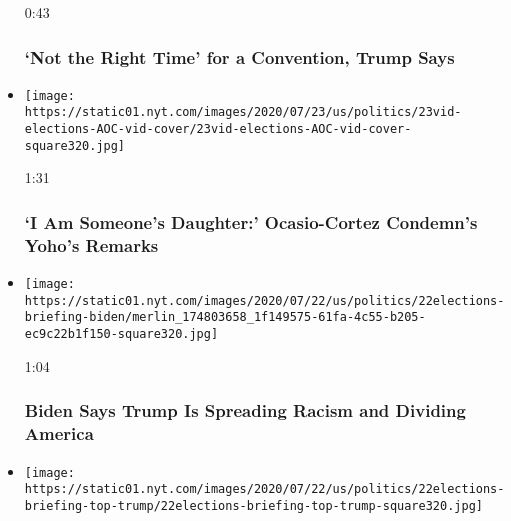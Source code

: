 \begin{itemize}
  0:43

  \hypertarget{not-the-right-time-for-a-convention-trump-says}{%
  \subsubsection{`Not the Right Time' for a Convention, Trump
  Says}\label{not-the-right-time-for-a-convention-trump-says}}
\item
  \href{https://www.nytimes.com/video/us/100000007253391/aoc-confronts-yoho.html?action=click\&module=video-series-bar\&region=header\&pgtype=Article\&playlistId=video/us-politics}{}

  \texttt{[image: https://static01.nyt.com/images/2020/07/23/us/politics/23vid-elections-AOC-vid-cover/23vid-elections-AOC-vid-cover-square320.jpg]}

  1:31

  \hypertarget{i-am-someones-daughter-ocasio-cortez-condemns-yohos-remarks}{%
  \subsubsection{`I Am Someone's Daughter:' Ocasio-Cortez Condemn's
  Yoho's
  Remarks}\label{i-am-someones-daughter-ocasio-cortez-condemns-yohos-remarks}}
\item
  \href{https://www.nytimes.com/video/us/100000007251300/biden-trump-racist-divide-america.html?action=click\&module=video-series-bar\&region=header\&pgtype=Article\&playlistId=video/us-politics}{}

  \texttt{[image: https://static01.nyt.com/images/2020/07/22/us/politics/22elections-briefing-biden/merlin\_174803658\_1f149575-61fa-4c55-b205-ec9c22b1f150-square320.jpg]}

  1:04

  \hypertarget{biden-says-trump-is-spreading-racism-and-dividing-america}{%
  \subsubsection{Biden Says Trump Is Spreading Racism and Dividing
  America}\label{biden-says-trump-is-spreading-racism-and-dividing-america}}
\item
  \href{https://www.nytimes.com/video/us/100000007251764/trump-surge-federal-law-enforcment.html?action=click\&module=video-series-bar\&region=header\&pgtype=Article\&playlistId=video/us-politics}{}

  \texttt{[image: https://static01.nyt.com/images/2020/07/22/us/politics/22elections-briefing-top-trump/22elections-briefing-top-trump-square320.jpg]}


\end{itemize}
